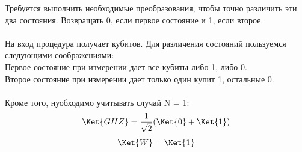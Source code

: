 \documentclass{article}
\begin{document}
Требуется выполнить необходимые преобразования, чтобы точно различить эти два состояния. Возвращать $0$, если первое состояние и 1, если второе. 
\\\\
На вход процедура получает  кубитов. Для различения состояний пользуемся следующими соображениями:\\

Первое состояние при измерении дает все кубиты либо 1, либо 0.\\

Второе состояние при измерении дает только один купит 1, остальные 0.\\ \\

Кроме того, нуобходимо учитывать случай N = 1:
$$\Ket{GHZ} = \frac{1}{\sqrt2}(\Ket{0} +\Ket{1})$$
$$\Ket{W} = \Ket{1}$$\\
\end{document}
